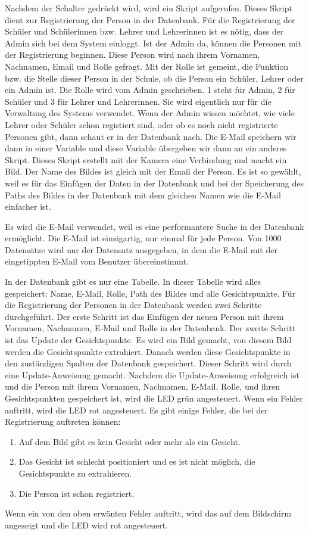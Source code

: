 \begin{enumerate}
Nachdem der Schalter gedr\"uckt wird, wird ein Skript aufgerufen. Dieses Skript dient zur Registrierung der Person in der Datenbank.
F\"ur die Registrierung der Sch\"uler und Sch\"ulerinnen bzw. Lehrer und Lehrerinnen ist es n\"otig, dass der Admin sich bei dem System einloggt. Ist der Admin da, k\"onnen die Personen mit der Registrierung beginnen.
Diese Person wird nach ihrem Vornamen, Nachnamen, Email und Rolle gefragt. Mit der Rolle ist gemeint, die Funktion bzw. die Stelle dieser Person in der Schule, ob die Person ein Sch\"uler, Lehrer oder ein Admin ist. Die Rolle wird vom Admin geschrieben. 1 steht f\"ur Admin, 2 f\"ur Sch\"uler und 3 f\"ur Lehrer und Lehrerinnen. Sie wird eigentlich nur f\"ur die Verwaltung des Systems verwendet. Wenn der Admin wissen m\"ochtet, wie viele Lehrer oder Sch\"uler schon registiert sind, oder ob es noch nicht registrierte Personen gibt, dann schaut er in der Datenbank nach.
Die E-Mail speichern wir dann in einer Variable und diese Variable \"ubergeben wir dann an ein anderes Skript. Dieses Skript erstellt mit der Kamera eine Verbindung und macht ein Bild. Der Name des Bildes ist gleich mit der Email der Person. Es ist so gew\"ahlt, weil es f\"ur das Einf\"ugen der Daten in der Datenbank und bei der Speicherung des Paths des Bildes in der Datenbank mit dem gleichen Namen wie die E-Mail einfacher ist.

Es wird die E-Mail verwendet, weil es eine performantere Suche in der Datenbank erm\"oglicht. Die E-Mail ist einzigartig, nur einmal f\"ur jede Person. Von 1000 Datens\"atze wird nur der Datensatz ausgegeben, in dem die E-Mail mit der eingetippten E-Mail vom Benutzer \"ubereinstimmt.

In der Datenbank gibt es nur eine Tabelle. In dieser Tabelle wird alles gespeichert: Name, E-Mail, Rolle, Path des Bildes und alle Gesichtspunkte. Für die Registrierung der Personen in der Datenbank werden zwei Schritte durchgef\"uhrt. Der erste Schritt ist das Einfügen der neuen Person mit ihrem Vornamen, Nachnamen, E-Mail und Rolle in der Datenbank. Der zweite Schritt ist das Update der Gesichtspunkte. Es wird ein Bild gemacht, von diesem Bild werden die Gesichtspunkte extrahiert. Danach werden diese Gesichtspunkte in den zuständigen Spalten der Datenbank gespeichert. Dieser Schritt wird durch eine Update-Anweisung gemacht. Nachdem die Update-Anweisung erfolgreich ist und die Person mit ihrem Vornamen, Nachnamen, E-Mail, Rolle, und ihren Gesichtspunkten gespeichert ist, wird die LED grün angesteuert. Wenn ein Fehler auftritt, wird die LED rot angesteuert. Es gibt einige Fehler, die bei der Registrierung auftreten können: 
\begin{enumerate}
	\item Auf dem Bild gibt es kein Gesicht oder mehr als ein Gesicht.
	\item Das Gesicht ist schlecht positioniert und es ist nicht m\"oglich, die Gesichtspunkte zu extrahieren.
	\item Die Person ist schon registriert.
\end{enumerate}
Wenn ein von den oben erw\"anten Fehler auftritt, wird das auf dem Bildschirm angezeigt und die LED wird rot angesteuert.
\end{enumerate}

